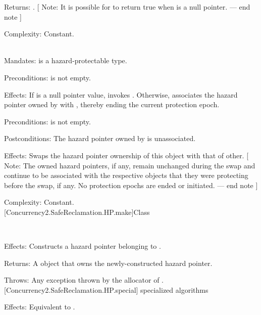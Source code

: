\pnum
Returns: . [ Note: It is possible for  to return true when  is
a null pointer. — end note ]

\pnum
Complexity: Constant.
\\

\\
\hspace*{1.1em}


\pnum
Mandates:  is a hazard-protectable type.

\pnum
Preconditions:  is not empty.

\pnum
Effects: If  is a null pointer value, invokes . Otherwise, associates the hazard pointer owned by  with , thereby ending the current protection epoch.
\\


\pnum
Preconditions:  is not empty.

\pnum
Postconditions: The hazard pointer owned by  is unassociated.
\\


\pnum
Effects: Swaps the hazard pointer ownership of this object with that of other. [ Note: The owned hazard pointers, if any, remain unchanged during the swap and continue to be associated with the respective objects that they were protecting before the swap, if any. No protection epochs are ended or initiated. — end note ]

\pnum
Complexity: Constant.
\\

[Concurrency2.SafeReclamation.HP.make]{Class }

\\
\hspace*{1.1em}

\pnum
Effects: Constructs a hazard pointer belonging to .

\pnum
Returns: A  object that owns the newly-constructed hazard pointer.

\pnum
Throws: Any exception thrown by the allocator of .
\\

[Concurrency2.SafeReclamation.HP.special]{ specialized algorithms}


\pnum
Effects: Equivalent to .
\\
